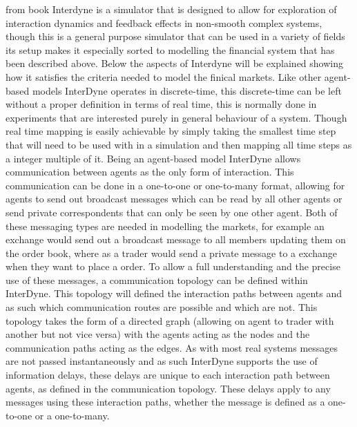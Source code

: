 \documentclass{article}
\begin{document}
from book 
Interdyne is a simulator that is designed to allow for exploration of interaction dynamics and feedback effects in non-smooth complex systems, though this is a general purpose simulator that can be used in a variety of fields its setup makes it especially sorted to modelling the financial system that has been described above.  Below the aspects of Interdyne will be explained showing how it satisfies the criteria needed to model the finical markets. 
Like other agent-based models InterDyne operates in discrete-time, this discrete-time can be left without a proper definition in terms of real time, this is normally done in experiments that are interested purely in general behaviour of a system. Though real time mapping is easily achievable by simply taking the smallest time step that will need to be used with in a simulation and then mapping all time steps as a integer multiple of it.  
Being an agent-based model InterDyne allows communication between agents as the only form of interaction. This communication can be done in a one-to-one or one-to-many format, allowing for agents to send out broadcast messages which can be read by all other agents or send private correspondents that can only be seen by one other agent. Both of these messaging types are needed in modelling the markets, for example an exchange would send out a broadcast message to all members updating them on the order book, where as a trader would send a private message to a exchange when they want to place a order. 
To allow a full understanding and the precise use of these messages, a communication topology can be defined within InterDyne. This topology will defined the interaction paths between agents and as such which communication routes are possible and which are not. This topology takes the form of a directed graph (allowing on agent to trader with another but not vice versa) with the agents acting as the nodes and the communication paths acting as the edges. 
As with most real systems messages are not passed instantaneously and as such InterDyne supports the use of information delays, these delays are unique to each interaction path between agents, as defined in the communication topology.  These delays apply to any messages using these interaction paths, whether the message is defined as a one-to-one or a one-to-many.  
\end{document}
